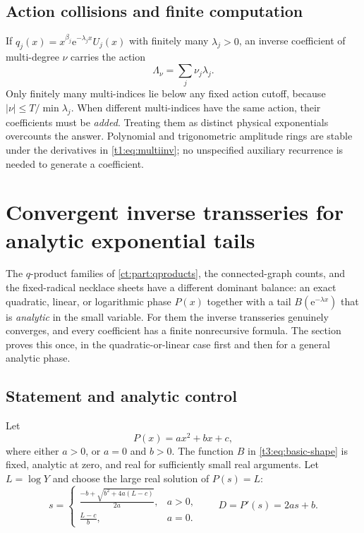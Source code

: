 \documentclass[11pt,openany]{book}
\numberwithin{equation}{chapter}
\theoremstyle{plain}
\theoremstyle{definition}
\theoremstyle{remark}
\newcommand{\ee}{\mathrm e}
\begin{document}
\subsection{Action collisions and finite computation}
If $q_j(x)=x^{\beta_j}\ee^{-\lambda_jx}U_j(x)$ with finitely many $\lambda_j>0$, an inverse coefficient of multi-degree $\nu$ carries the action
\begin{equation}
 \Lambda_\nu=\sum_j\nu_j\lambda_j.
 \label{t1:eq:action}
\end{equation}
Only finitely many multi-indices lie below any fixed action cutoff, because $|\nu|\le T/\min\lambda_j$. When different multi-indices have the same action, their coefficients must be \emph{added}. Treating them as distinct physical exponentials overcounts the answer. Polynomial and trigonometric amplitude rings are stable under the derivatives in \eqref{t1:eq:multiinv}; no unspecified auxiliary recurrence is needed to generate a coefficient.

\section{Convergent inverse transseries for analytic exponential tails}
\label{ct:sec:quadratic}

The $q$-product families of \cref{ct:part:qproducts}, the connected-graph
counts, and the fixed-radical necklace sheets have a different dominant
balance: an exact quadratic, linear, or logarithmic phase $P(x)$ together
with a tail $B(\ee^{-\lambda x})$ that is \emph{analytic} in the small
variable.  For them the inverse transseries genuinely converges, and every
coefficient has a finite nonrecursive formula.  The section proves this
once, in the quadratic-or-linear case first and then for a general analytic
phase.

\label{t3:sec:engine}

\subsection{Statement and analytic control}

Let
\begin{equation}\label{t3:eq:Pquadratic}
 P(x)=a x^2+b x+c,
\end{equation}
where either $a>0$, or $a=0$ and $b>0$. The function $B$ in \eqref{t3:eq:basic-shape} is fixed, analytic at zero, and real for sufficiently small real arguments. Let $L=\log Y$ and choose the large real solution of $P(s)=L$:
\begin{equation}\label{t3:eq:center}
 s=\begin{cases}
 \displaystyle\frac{-b+\sqrt{b^2+4a(L-c)}}{2a},&a>0,\\[0.8em]
 \displaystyle\frac{L-c}{b},&a=0.
 \end{cases}
 \qquad D=P'(s)=2as+b.
\end{equation}
\end{document}
